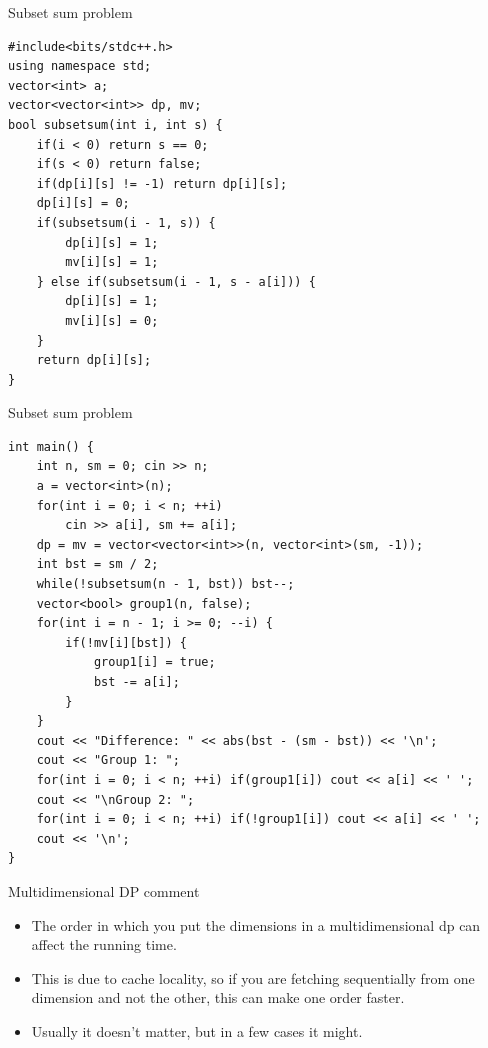 \documentclass{beamer}
\begin{document}
\begin{frame}{Subset sum problem}
    \begin{verbatim}
#include<bits/stdc++.h>
using namespace std;
vector<int> a;
vector<vector<int>> dp, mv;
bool subsetsum(int i, int s) {
	if(i < 0) return s == 0;
	if(s < 0) return false;
    if(dp[i][s] != -1) return dp[i][s];
    dp[i][s] = 0;
    if(subsetsum(i - 1, s)) {
        dp[i][s] = 1;
        mv[i][s] = 1;
    } else if(subsetsum(i - 1, s - a[i])) {
        dp[i][s] = 1;
        mv[i][s] = 0;
    }
	return dp[i][s];
}
    \end{verbatim}
\end{frame}

\begin{frame}{Subset sum problem}
    \begin{verbatim}
int main() {
	int n, sm = 0; cin >> n;
	a = vector<int>(n);
	for(int i = 0; i < n; ++i)
		cin >> a[i], sm += a[i];
	dp = mv = vector<vector<int>>(n, vector<int>(sm, -1));
	int bst = sm / 2;
	while(!subsetsum(n - 1, bst)) bst--;
	vector<bool> group1(n, false);
	for(int i = n - 1; i >= 0; --i) {
		if(!mv[i][bst]) {
			group1[i] = true;
			bst -= a[i];
		}
	}
	cout << "Difference: " << abs(bst - (sm - bst)) << '\n';
	cout << "Group 1: ";
	for(int i = 0; i < n; ++i) if(group1[i]) cout << a[i] << ' ';
	cout << "\nGroup 2: ";
	for(int i = 0; i < n; ++i) if(!group1[i]) cout << a[i] << ' ';
	cout << '\n';
}
    \end{verbatim}
\end{frame}

\begin{frame}[plain]{Multidimensional DP comment}
    \vspace{10pt}

    \begin{itemize}
		\item The order in which you put the dimensions in a multidimensional dp can affect the running time.
		
		\item This is due to cache locality, so if you are fetching sequentially from one dimension and not the other, this can make one order faster.    
    
        \item Usually it doesn't matter, but in a few cases it might.
    \end{itemize}
\end{frame}
\end{document}
